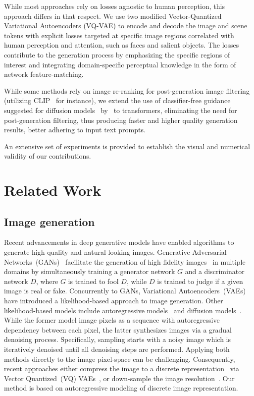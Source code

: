 \documentclass[final]{cvpr}
\begin{document}
While most approaches rely on losses agnostic to human perception, this approach differs in that respect. We use two modified Vector-Quantized Variational Autoencoders (VQ-VAE) to encode and decode the image and scene tokens with explicit losses targeted at specific image regions correlated with human perception and attention, such as faces and salient objects.
The losses contribute to the generation process by emphasizing the specific regions of interest and integrating domain-specific perceptual knowledge in the form of network feature-matching. 

While some methods rely on image re-ranking for post-generation image filtering (utilizing CLIP~\cite{radford2021learning} for instance), we extend the use of classifier-free guidance suggested for diffusion models~\cite{sohl2015deep,ho2020denoising} by~\cite{ho2021classifier,nichol2021glide} to transformers, eliminating the need for post-generation filtering, thus producing faster and higher quality generation results, better adhering to input text prompts.

An extensive set of experiments is provided to establish the visual and numerical validity of our contributions.

\section{Related Work}
\subsection{Image generation} Recent advancements in deep generative models have enabled algorithms to generate high-quality and natural-looking images. Generative Adversarial Networks~(GANs)~\cite{goodfellow2014generative} facilitate the generation of high fidelity images~\cite{karras2021alias,brock2018large,karras2020analyzing,tseng2021regularizing} in multiple domains by simultaneously training a generator network $G$ and a discriminator network $D$, where $G$ is trained to fool $D$, while $D$ is trained to judge if a given image is real or fake. Concurrently to GANs, Variational Autoencoders~(VAEs)~\cite{kingma2013auto,vahdat2020nvae} have introduced a likelihood-based approach to image generation. Other likelihood-based models include autoregressive models~\cite{van2016conditional,parmar2018image,esser2021taming, pmlr-v119-chen20s} and diffusion models~\cite{dhariwal2021diffusion,ho2022cascaded,ho2020denoising}. While the former model image pixels as a sequence with autoregressive dependency between each pixel, the latter synthesizes images via a gradual denoising process. Specifically, sampling starts with a noisy image which is iteratively denoised until all denoising steps are performed. Applying both methods directly to the image pixel-space can be challenging. Consequently, recent approaches either compress the image to a discrete representation~\cite{esser2021taming,van2017neural} via Vector Quantized~(VQ) VAEs~\cite{van2017neural}, or down-sample the image resolution~\cite{dhariwal2021diffusion,ho2022cascaded}. Our method is based on autoregressive modeling of discrete image representation.
\end{document}

